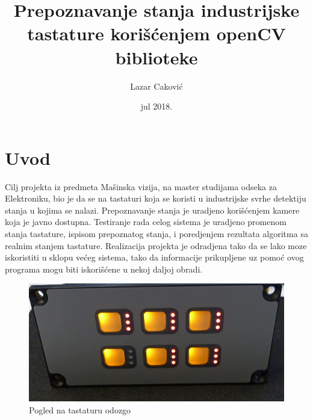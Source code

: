 \documentclass[a4paper,12pt, projekat]{etf}
\title{Prepoznavanje stanja industrijske tastature kori\v{s}\'{c}enjem openCV
biblioteke}
\author{Lazar Caković}
\date{jul 2018.}
\begin{document}
	\maketitle

	\tableofcontents

	\listoffigures

	\newpage

	\chapter{Uvod}
        Cilj projekta iz predmeta Ma\v{s}inska vizija, na master studijama odseka
        za Elektroniku, bio je da se na tastaturi koja se koristi u industrijske
        svrhe detektiju stanja u kojima se nalazi. Prepoznavanje stanja je
        uradjeno kori\v{s}\'{c}enjem kamere koja je javno dostupna. Testiranje
        rada celog sistema je uradjeno promenom stanja tastature, ispisom
        prepoznatog stanja, i poredjenjem rezultata algoritma sa realnim
        stanjem tastature. Realizacija projekta je odradjena tako
        da se lako moze iskoristiti u sklopu ve\'{c}eg sistema, tako da informacije
        prikupljene uz pomo\'{c} ovog programa mogu biti iskori\v{s}\'{c}ene u nekoj daljoj
        obradi.

        \begin{figure}[htb]
            \centering
            \includegraphics[scale=.5, angle=90]{front.jpg}
            \caption{Pogled na tastaturu odozgo}
            \label{fig:keyboard}
        \end{figure}

        \newpage
\end{document}
